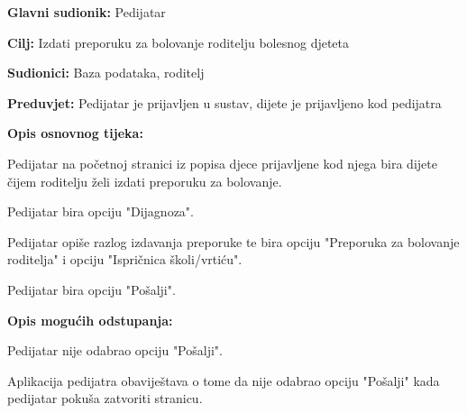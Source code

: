 					
					\noindent {}
					\begin{packed_item}
						
						\item \textbf{Glavni sudionik: }Pedijatar
						\item  \textbf{Cilj:} Izdati preporuku za bolovanje roditelju bolesnog djeteta
						\item  \textbf{Sudionici:} Baza podataka, roditelj
						\item  \textbf{Preduvjet:} Pedijatar je prijavljen u sustav, dijete je prijavljeno kod pedijatra
						\item  \textbf{Opis osnovnog tijeka:}
						
						\item[] \begin{packed_enum}
							
							\item Pedijatar na početnoj stranici iz popisa djece prijavljene kod njega bira dijete čijem roditelju želi izdati preporuku za bolovanje.
							\item Pedijatar bira opciju "Dijagnoza".
							\item Pedijatar opiše razlog izdavanja preporuke te bira opciju "Preporuka za bolovanje roditelja" i opciju "Ispričnica školi/vrtiću".
							\item Pedijatar bira opciju "Pošalji".
						\end{packed_enum}
						
						\item  \textbf{Opis mogućih odstupanja:}
						
						\item[] \begin{packed_item}
							
							\item[4.a] Pedijatar nije odabrao opciju "Pošalji".
							\item[] \begin{packed_enum}
								
								\item Aplikacija pedijatra obaviještava o tome da nije odabrao opciju "Pošalji" kada pedijatar pokuša zatvoriti stranicu.
							\end{packed_enum}
							
							
						\end{packed_item}
						
						
					\end{packed_item}
					

